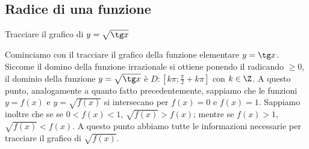 \documentclass{article}     %
\begin{document}
    \subsection{Radice di una funzione}
        \begin{ex*}
            Tracciare il grafico di $y=\sqrt{\tg x}$
        \end{ex*}
        Cominciamo con il tracciare il grafico della funzione elementare $y=\tg x$. Siccome il domino della funzione irrazionale si ottiene ponendo il radicando $\geq 0$, il dominio della funzione $y=\sqrt{\tg x}$ è $D: [k\pi; \frac{\pi}{2}+k\pi]$ con $k\in \Z$. A questo punto, analogamente a quanto fatto precedentemente, sappiamo che le funzioni $y=f(x)$ e $y=\sqrt{f(x)}$ si intersecano per $f(x)=0$ e $f(x)=1$. Sappiamo inoltre che se se $0<f(x)<1$, $\sqrt{f(x)}>f(x)$; mentre se $f(x)>1$, $\sqrt{f(x)}<f(x)$. A questo punto abbiamo tutte le informazioni necessarie per tracciare il grafico di $\sqrt{f(x)}$.
\end{document}
